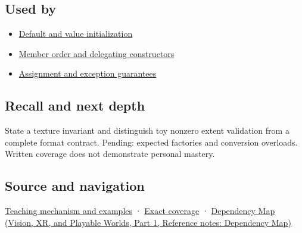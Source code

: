 \subsection{Used by}\label{appendix-7f8ec83d0886-used-by}

\hypertarget{appendix-7f8ec83d0886-used-by}{}

\begin{itemize}
\tightlist
\item
  \hyperref[appendix-ba8c1a9fe03f]{Default and value initialization}
\item
  \hyperref[appendix-3cb49709605a]{Member order and delegating constructors}
\item
  \hyperref[appendix-bea6beb5350f]{Assignment and exception guarantees}
\end{itemize}

\subsection{Recall and next depth}\label{appendix-7f8ec83d0886-recall-and-next-depth}

\hypertarget{appendix-7f8ec83d0886-recall-and-next-depth}{}

State a texture invariant and distinguish toy nonzero extent validation from a complete format contract. Pending: expected factories and conversion overloads. Written coverage does not demonstrate personal mastery.

\subsection{Source and navigation}\label{appendix-7f8ec83d0886-source-and-navigation}

\hypertarget{appendix-7f8ec83d0886-source-and-navigation}{}

\hyperref[01-foundations-i-ch003-construction-establishes-a-usable-state]{Teaching mechanism and examples} · \hyperref[appendix-fd090d982a15-m009---parts-127-147]{Exact coverage} · \href{../07-Vision-XR-and-Playable-Worlds-P01/main.pdf\#nameddest=appendix-4ad47bdd269a}{Dependency Map (Vision, XR, and Playable Worlds, Part 1, Reference notes: Dependency Map)}
